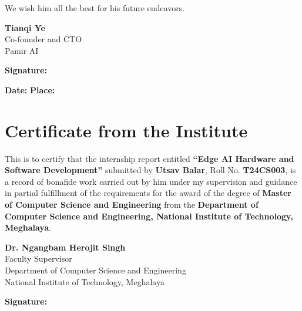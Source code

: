 \documentclass[12pt,a4paper]{report}
\begin{document}
We wish him all the best for his future endeavors.

\vspace{2cm}

\noindent
\textbf{Tianqi Ye} \\
Co-founder and CTO \\
Pamir AI

\vspace{1.5cm}

\noindent
\textbf{Signature:} \underline{\hspace{6cm}}

\vspace{0.5cm}

\noindent
\textbf{Date:} \underline{\hspace{4cm}} \hspace{1cm} \textbf{Place:} \underline{\hspace{4cm}}

\newpage
\chapter*{Certificate from the Institute}

\vspace{1cm}

This is to certify that the internship report entitled \textbf{``Edge AI Hardware and Software Development''} submitted by \textbf{Utsav Balar}, Roll No. \textbf{T24CS003}, is a record of bonafide work carried out by him under my supervision and guidance in partial fulfillment of the requirements for the award of the degree of \textbf{Master of Computer Science and Engineering} from the \textbf{Department of Computer Science and Engineering, National Institute of Technology, Meghalaya}.

\vspace{2cm}

\noindent
\textbf{Dr. Ngangbam Herojit Singh} \\
Faculty Supervisor \\
Department of Computer Science and Engineering \\
National Institute of Technology, Meghalaya

\vspace{1.5cm}

\noindent
\textbf{Signature:} \underline{\hspace{6cm}}
\end{document}

